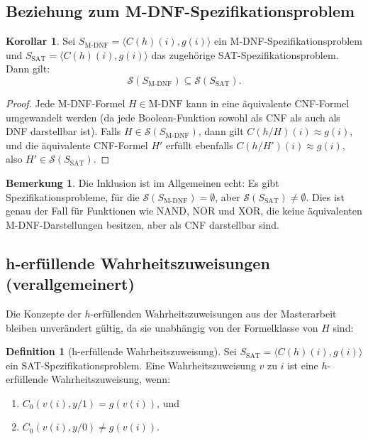 ﻿\documentclass[a4paper,12pt]{article}
\theoremstyle{definition}
\newtheorem{definition}{Definition}
\newtheorem{korollar}{Korollar}
\newtheorem{bemerkung}{Bemerkung}
\begin{document}
\subsection{Beziehung zum M-DNF-Spezifikationsproblem}

\begin{korollar}
    Sei $S_{\text{M-DNF}} = \langle C(h)(i), g(i) \rangle$ ein M-DNF-Spezifikationsproblem und $S_{\text{SAT}} = \langle C(h)(i), g(i) \rangle$ das zugehörige SAT-Spezifikationsproblem. Dann gilt:
    \[
    \mathcal{S}(S_{\text{M-DNF}}) \subseteq \mathcal{S}(S_{\text{SAT}}).
    \]
\end{korollar}

\begin{proof}
    Jede M-DNF-Formel $H \in \text{M-DNF}$ kann in eine äquivalente CNF-Formel umgewandelt werden (da jede Boolean-Funktion sowohl als CNF als auch als DNF darstellbar ist). Falls $H \in \mathcal{S}(S_{\text{M-DNF}})$, dann gilt $C(h/H)(i) \approx g(i)$, und die äquivalente CNF-Formel $H'$ erfüllt ebenfalls $C(h/H')(i) \approx g(i)$, also $H' \in \mathcal{S}(S_{\text{SAT}})$.
\end{proof}

\begin{bemerkung}
    Die Inklusion ist im Allgemeinen echt: Es gibt Spezifikationsprobleme, für die $\mathcal{S}(S_{\text{M-DNF}}) = \emptyset$, aber $\mathcal{S}(S_{\text{SAT}}) \neq \emptyset$. Dies ist genau der Fall für Funktionen wie NAND, NOR und XOR, die keine äquivalenten M-DNF-Darstellungen besitzen, aber als CNF darstellbar sind.
\end{bemerkung}

\subsection{h-erfüllende Wahrheitszuweisungen (verallgemeinert)}

Die Konzepte der $h$-erfüllenden Wahrheitszuweisungen aus der Masterarbeit bleiben unverändert gültig, da sie unabhängig von der Formelklasse von $H$ sind:

\begin{definition}[h-erfüllende Wahrheitszuweisung]
    Sei $S_{\text{SAT}} = \langle C(h)(i), g(i) \rangle$ ein SAT-Spezifikationsproblem. Eine Wahrheitszuweisung $v$ zu $i$ ist eine $h$-erfüllende Wahrheitszuweisung, wenn:
    \begin{enumerate}
        \item $C_0(v(i), y/1) = g(v(i))$, und
        \item $C_0(v(i), y/0) \neq g(v(i))$.
    \end{enumerate}
\end{definition}
\end{document}
